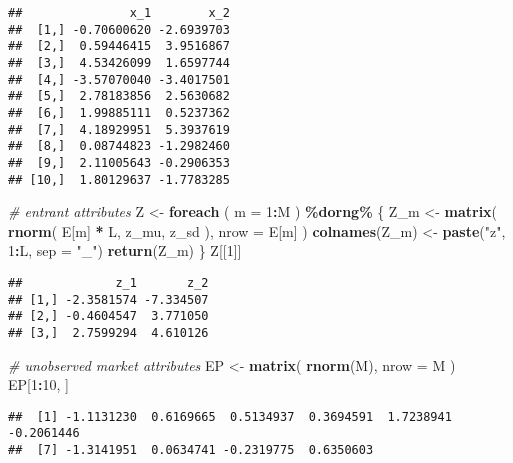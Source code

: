 \documentclass[
]{book}
\newenvironment{Shaded}{\begin{snugshade}}{\end{snugshade}}
\newcommand{\AttributeTok}[1]{\textcolor[rgb]{0.13,0.29,0.53}{#1}}
\newcommand{\CommentTok}[1]{\textcolor[rgb]{0.56,0.35,0.01}{\textit{#1}}}
\newcommand{\DecValTok}[1]{\textcolor[rgb]{0.00,0.00,0.81}{#1}}
\newcommand{\FunctionTok}[1]{\textcolor[rgb]{0.13,0.29,0.53}{\textbf{#1}}}
\newcommand{\NormalTok}[1]{#1}
\newcommand{\OtherTok}[1]{\textcolor[rgb]{0.56,0.35,0.01}{#1}}
\newcommand{\SpecialCharTok}[1]{\textcolor[rgb]{0.81,0.36,0.00}{\textbf{#1}}}
\newcommand{\StringTok}[1]{\textcolor[rgb]{0.31,0.60,0.02}{#1}}
\begin{document}
\begin{verbatim}
##               x_1        x_2
##  [1,] -0.70600620 -2.6939703
##  [2,]  0.59446415  3.9516867
##  [3,]  4.53426099  1.6597744
##  [4,] -3.57070040 -3.4017501
##  [5,]  2.78183856  2.5630682
##  [6,]  1.99885111  0.5237362
##  [7,]  4.18929951  5.3937619
##  [8,]  0.08744823 -1.2982460
##  [9,]  2.11005643 -0.2906353
## [10,]  1.80129637 -1.7783285
\end{verbatim}

\begin{Shaded}
\begin{Highlighting}[]
\CommentTok{\# entrant attributes}
\NormalTok{Z }\OtherTok{\textless{}{-}}
  \FunctionTok{foreach}\NormalTok{ (}
    \AttributeTok{m =} \DecValTok{1}\SpecialCharTok{:}\NormalTok{M}
\NormalTok{    ) }\SpecialCharTok{\%dorng\%}\NormalTok{ \{}
\NormalTok{    Z\_m }\OtherTok{\textless{}{-}} 
      \FunctionTok{matrix}\NormalTok{(}
      \FunctionTok{rnorm}\NormalTok{(}
\NormalTok{        E[m] }\SpecialCharTok{*}\NormalTok{ L, }
\NormalTok{        z\_mu, }
\NormalTok{        z\_sd}
\NormalTok{        ),}
      \AttributeTok{nrow =}\NormalTok{ E[m]}
\NormalTok{    )}
    \FunctionTok{colnames}\NormalTok{(Z\_m) }\OtherTok{\textless{}{-}} \FunctionTok{paste}\NormalTok{(}\StringTok{"z"}\NormalTok{, }\DecValTok{1}\SpecialCharTok{:}\NormalTok{L, }\AttributeTok{sep =} \StringTok{"\_"}\NormalTok{)}
    \FunctionTok{return}\NormalTok{(Z\_m)}
\NormalTok{  \}}
\NormalTok{Z[[}\DecValTok{1}\NormalTok{]]}
\end{Highlighting}
\end{Shaded}

\begin{verbatim}
##             z_1       z_2
## [1,] -2.3581574 -7.334507
## [2,] -0.4604547  3.771050
## [3,]  2.7599294  4.610126
\end{verbatim}

\begin{Shaded}
\begin{Highlighting}[]
\CommentTok{\# unobserved market attributes}
\NormalTok{EP }\OtherTok{\textless{}{-}} 
  \FunctionTok{matrix}\NormalTok{(}
  \FunctionTok{rnorm}\NormalTok{(M),}
  \AttributeTok{nrow =}\NormalTok{ M}
\NormalTok{  )}
\NormalTok{EP[}\DecValTok{1}\SpecialCharTok{:}\DecValTok{10}\NormalTok{, ]}
\end{Highlighting}
\end{Shaded}

\begin{verbatim}
##  [1] -1.1131230  0.6169665  0.5134937  0.3694591  1.7238941 -0.2061446
##  [7] -1.3141951  0.0634741 -0.2319775  0.6350603
\end{verbatim}
\end{document}
